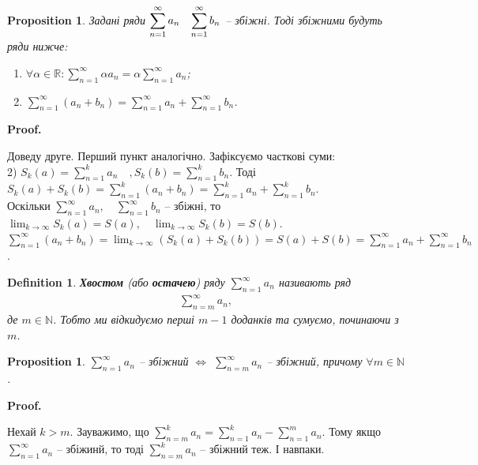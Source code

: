 \documentclass[a4paper, 10pt]{article}
\makeatletter
\def\huge{\displaystyle}
\theoremstyle{theoremdd}
\theoremstyle{theoremdd}
\theoremstyle{theoremdd}
\newtheorem{definition}[theorem]{Definition}
\theoremstyle{theoremdd}
\theoremstyle{theoremdd}
\theoremstyle{theoremdd}
\newtheorem{proposition}[theorem]{Proposition}
\theoremstyle{theoremdd}
\theoremstyle{theoremdd}
\theoremstyle{theoremdd}
\renewenvironment{proof}[1][Proof.\\]{\par
\pushQED{\hfill \qed}%
\normalfont \topsep6\p@\@plus6\p@\relax
\trivlist
\item\relax
{\bfseries
#1\@addpunct{.}}\hspace\labelsep\ignorespaces
}{%
\popQED\endtrivlist\@endpefalse
}
\makeatother
\begin{document}
\begin{proposition}
Задані ряди $\huge \sum_{n=1}^{\infty} a_n \hspace{0.3cm} \sum_{n=1}^{\infty} b_n$ -- збіжні. Тоді збіжними будуть ряди нижче:
\begin{enumerate}[nosep,wide=0pt,label={\arabic*)}]
\item $\forall \alpha \in \mathbb{R}: \huge \sum_{n=1}^{\infty} \alpha a_n = \alpha \sum_{n=1}^\infty a_n$;
\item $\huge \sum_{n=1}^{\infty} (a_n+b_n) = \sum_{n=1}^{\infty} a_n + \sum_{n=1}^{\infty} b_n$.
\end{enumerate}
\end{proposition}

\begin{proof}
Доведу друге. Перший пункт аналогічно. Зафіксуємо часткові суми:\\
2) $\huge S_k(a) = \sum_{n=1}^k a_n \quad, S_k(b) = \sum_{n=1}^k b_n$. Тоді $S_k(a) + S_k(b) = \huge \sum_{n=1}^k (a_n+b_n) = \sum_{n=1}^k a_n + \sum_{n=1}^k b_n$.\\
Оскільки $\huge \sum_{n=1}^{\infty} a_n, \quad \sum_{n=1}^{\infty} b_n$ -- збіжні, то $\huge \lim_{k \to \infty} S_k(a) = S(a), \quad \huge \lim_{k \to \infty} S_k(b) = S(b)$.\\
$\huge \sum_{n=1}^{\infty} (a_n+b_n) = \lim_{k \to \infty} (S_k(a) + S_k(b)) = S(a) + S(b) = \sum_{n=1}^{\infty} a_n + \sum_{n=1}^{\infty} b_n$.
\end{proof}

\begin{definition}
\textbf{Хвостом} (або \textbf{остачею}) ряду $\huge \sum_{n=1}^\infty a_n$ називають ряд
\begin{align*}
\sum_{n=m}^{\infty} a_n,
\end{align*}
де $m \in \mathbb{N}$. Тобто ми відкидуємо перші $m-1$ доданків та сумуємо, починаючи з $m$.
\end{definition}

\begin{proposition}
$\huge \sum_{n=1}^\infty a_n$ -- збіжний $\iff$ $\huge \sum_{n=m}^\infty a_n$ -- збіжний, причому $\forall m \in \mathbb{N}$.
\end{proposition}

\begin{proof}
Нехай $k > m$. Зауважимо, що $\displaystyle\sum_{n=m}^k a_n = \sum_{n=1}^k a_n - \sum_{n=1}^m a_n$. Тому якщо $\displaystyle\sum_{n=1}^\infty a_n$ -- збіжинй, то тоді $\displaystyle\sum_{n=m}^k a_n$ -- збіжний теж. І навпаки.
\end{proof}
\end{document}
